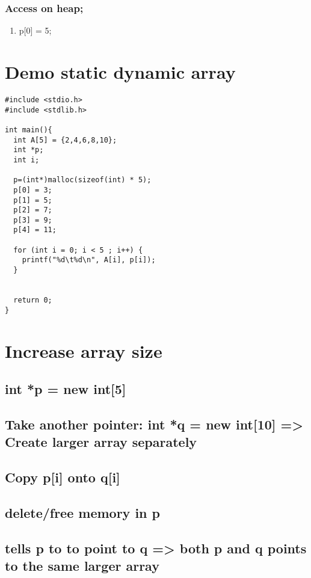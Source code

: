 \documentclass{article}
\begin{document}
\subsubsection{Access on heap;}
\label{sec:org92aaeaa}
\begin{enumerate}
\item p[0] = 5;
\label{sec:org1bf3c64}
\end{enumerate}
\section{Demo static dynamic array}
\label{sec:org0690ef9}
\begin{verbatim}
#include <stdio.h>
#include <stdlib.h>

int main(){
  int A[5] = {2,4,6,8,10};
  int *p;
  int i;

  p=(int*)malloc(sizeof(int) * 5);
  p[0] = 3;
  p[1] = 5;
  p[2] = 7;
  p[3] = 9;
  p[4] = 11;

  for (int i = 0; i < 5 ; i++) {
    printf("%d\t%d\n", A[i], p[i]);
  }


  return 0;
}

\end{verbatim}
\section{Increase array size}
\label{sec:org67470d9}
\subsection{int *p = new int[5]}
\label{sec:org9902107}
\subsection{Take another pointer: int *q = new int[10] => Create larger array separately}
\label{sec:org59262aa}
\subsection{Copy p[i] onto q[i]}
\label{sec:org413c228}
\subsection{delete/free memory in p}
\label{sec:org414c5f8}
\subsection{tells p to to point to q => both p and q points to the same larger array}
\label{sec:orgaa99032}
\end{document}
